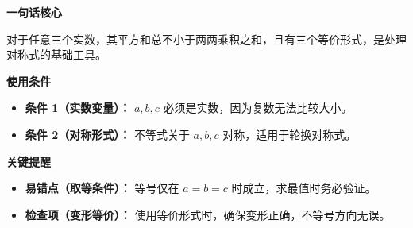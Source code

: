 \begin{summarybox}
\textbf{\textcolor{CSummary}{一句话核心}}

对于任意三个实数，其平方和总不小于两两乘积之和，且有三个等价形式，是处理对称式的基础工具。

\medskip
\textbf{\textcolor{CSummary}{使用条件}}
\begin{itemize}[leftmargin=*, itemsep=0.5em, topsep=0.4em]
    \item \textbf{条件 1（实数变量）：} $a, b, c$ 必须是实数，因为复数无法比较大小。
    \item \textbf{条件 2（对称形式）：} 不等式关于 $a, b, c$ 对称，适用于轮换对称式。
\end{itemize}

\medskip
\textbf{\textcolor{CSummary}{关键提醒}}
\begin{itemize}[leftmargin=*, itemsep=0.5em, topsep=0.4em]
    \item \textbf{易错点（取等条件）：} 等号仅在 $a=b=c$ 时成立，求最值时务必验证。
    \item \textbf{检查项（变形等价）：} 使用等价形式时，确保变形正确，不等号方向无误。
\end{itemize}
\end{summarybox}
